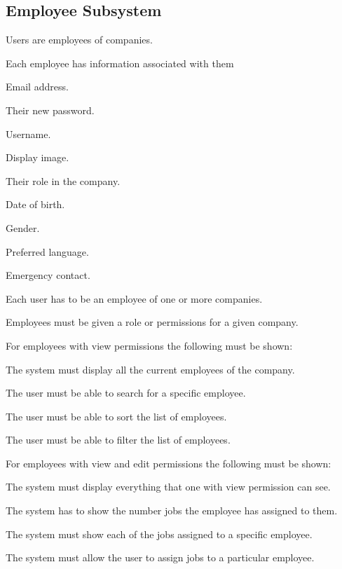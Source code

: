 \documentclass{article}
\begin{document}
	\subsection*{Employee Subsystem}	
	\begin{list}{R.}{}
		\item Users are employees of companies.
		\item Each employee has information associated with them 
			\begin{list}{R..}{}
			\item Email address.
			\item Their new password. 
			\item Username.
			\item Display image.
			\item Their role in the company.
			\item Date of birth.
			\item Gender.
			\item Preferred language.
			\item Emergency contact. 
		\end{list} 
		\item Each user has to be an employee of one or more companies. 
		\item Employees must be given a role or permissions for a given company.
		\item For employees with view permissions the following must be shown: 
		\begin{list}{R.}{}
			\item The system must display all the current employees of the company.
			\item The user must be able to search for a specific employee.
			\item The user must be able to sort the list of employees.
			\item The user must be able to filter the list of employees.
		\end{list}
		\item For employees with view and edit permissions the following must be shown: 
		\begin{list}{R.}{}
			\item The system must display everything that one with view permission can see.
			\item The system has to show the number jobs the employee has assigned to them.
			\item The system must show each of the jobs assigned to a specific employee.
			\item The system must allow the user to assign jobs to a particular employee.
		\end{list}			
	\end{list}
	
\end{document}
